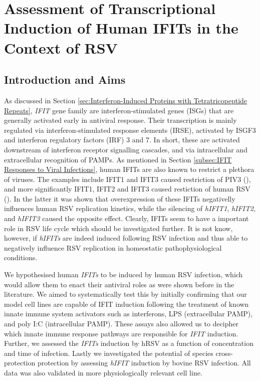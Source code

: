 \chapter{Assessment of Transcriptional Induction of Human IFITs in the Context of RSV} \label{ch:Assessment of Transcriptional Induction of Human IFITs in the Context of RSV}
\section{Introduction and Aims} \label{sec:Introduction and Aims-Chapter 1}
As discussed in Section \ref{sec:Interferon-Induced Proteins with Tetratricopeptide Repeats}, \textit{IFIT} gene family are interferon-stimulated genes (ISGs) that are generally activated early in antiviral response. Their transcription is mainly regulated via interferon-stimulated response elements (IRSE), activated by ISGF3 and interferon regulatory factors (IRF) 3 and 7. In short, these are activated downstream of interferon receptor signalling cascades, and via intracellular and extracellular recognition of PAMPs. As mentioned in Section \ref{subsec:IFIT Responses to Viral Infections}, human IFITs are also known to restrict a plethora of viruses. The examples include IFIT1 and IFIT3 caused restriction of PIV3 (\cite{Rabbani2016Identification3}), and more significantly IFIT1, IFIT2 and IFIT3 caused restiction of human RSV (\cite{Drori2020InfluenzaProteins}). In the latter it was shown that overexpression of these IFITs negativelly influences human RSV replication kinetics, while the silencing of \textit{hIFIT1}, \textit{hIFIT2}, and \textit{hIFIT3} caused the opposite effect. Clearly, IFITs seem to have a important role in RSV life cycle which should be investigated further. It is not know, however, if \textit{hIFITs} are indeed induced following RSV infection and thus able to negatively influence RSV replication in homeostatic pathophysiological conditions.

We hypothesised human \textit{IFITs} to be induced by human RSV infection, which would allow them to enact their antiviral roles as were shown before in the literature. We aimed to systematically test this by initially confirming that our model cell lines are capable of IFIT induction following the treatment of known innate immune system activators such as interferons, LPS (extracellular PAMP), and poly I:C (intracellular PAMP). These assays also allowed us to decipher which innate immune response pathways are responsible for \textit{IFIT} induction. Further, we assessed the \textit{IFITs} induction by hRSV as a function of concentration and time of infection. Lastly we investigated the potential of species cross-protection protection by assessing \textit{hIFIT} induction by bovine RSV infection. All data was also validated in more physiologically relevant cell line. 

